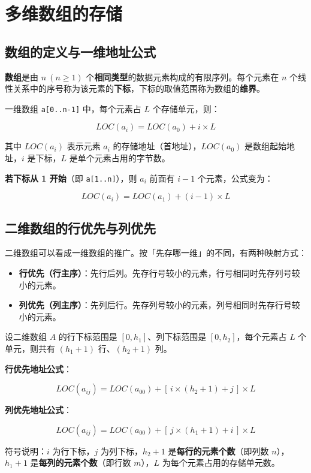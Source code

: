 \documentclass[11pt,openany,UTF8]{ctexbook}
\begin{document}
\section{多维数组的存储}

\subsection{数组的定义与一维地址公式}

\textbf{数组}是由 $n\ (n \ge 1)$ 个\textbf{相同类型}的数据元素构成的有限序列。每个元素在 $n$ 个线性关系中的序号称为该元素的\textbf{下标}，下标的取值范围称为数组的\textbf{维界}。

一维数组 \texttt{a[0..n-1]\allowbreak{}} 中，每个元素占 $L$ 个存储单元，则：

\[LOC(a_i) = LOC(a_0) + i \times L\]

其中 $LOC(a_i)$ 表示元素 $a_i$ 的存储地址（首地址），$LOC(a_0)$ 是数组起始地址，$i$ 是下标，$L$ 是单个元素占用的字节数。

\textbf{若下标从 1 开始}（即 \texttt{a[1..n]\allowbreak{}}），则 $a_i$ 前面有 $i-1$ 个元素，公式变为：

\[LOC(a_i) = LOC(a_1) + (i - 1) \times L\]

\subsection{二维数组的行优先与列优先}

二维数组可以看成一维数组的推广。按「先存哪一维」的不同，有两种映射方式：

\begin{itemize}
\item \textbf{行优先（行主序）}：先行后列。先存行号较小的元素，行号相同时先存列号较小的元素。
\item \textbf{列优先（列主序）}：先列后行。先存列号较小的元素，列号相同时先存行号较小的元素。
\end{itemize}
设二维数组 $A$ 的行下标范围是 $[0, h_1]$、列下标范围是 $[0, h_2]$，每个元素占 $L$ 个单元，则共有 $(h_1+1)$ 行、$(h_2+1)$ 列。

\textbf{行优先地址公式}：

\[LOC(a_{ij}) = LOC(a_{00}) + \left[\, i \times (h_2 + 1) + j \,\right] \times L\]

\textbf{列优先地址公式}：

\[LOC(a_{ij}) = LOC(a_{00}) + \left[\, j \times (h_1 + 1) + i \,\right] \times L\]

符号说明：$i$ 为行下标，$j$ 为列下标，$h_2 + 1$ 是\textbf{每行的元素个数}（即列数 $n$），$h_1 + 1$ 是\textbf{每列的元素个数}（即行数 $m$），$L$ 为每个元素占用的存储单元数。
\end{document}
